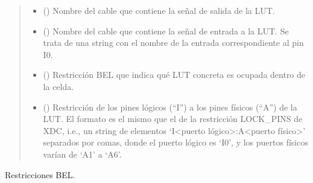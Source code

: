\documentclass[letterpaper,10pt,english]{sphinxmanual}
\begin{document}
\begin{fulllineitems}
\begin{quote}
\begin{description}
\begin{itemize}
\item {} 
\sphinxAtStartPar
{} () \textendash{} Nombre del cable que contiene la señal de salida de la LUT.

\item {} 
\sphinxAtStartPar
{} () \textendash{} Nombre del cable que contiene la señal de entrada a la LUT. Se trata de una string con el nombre de la entrada correspondiente al pin I0.

\item {} 
\sphinxAtStartPar
{} (\sphinxstyleliteralemphasis{\sphinxupquote{, }}\sphinxstyleliteralemphasis{\sphinxupquote{, }}\sphinxstyleliteralemphasis{\sphinxupquote{, }}) \textendash{} Restricción BEL que indica qué LUT concreta es ocupada dentro de la celda.

\item {} 
\sphinxAtStartPar
{} () \textendash{} Restricción de los pines lógicos (“I”) a los pines físicos (“A”) de la LUT. El formato es el mismo que el de la restricción LOCK\_PINS de XDC, i.e., un string de elementos ‘I\textless{}puerto lógico\textgreater{}:A\textless{}puerto físico\textgreater{}’ separados por comas, donde el puerto lógico es ‘I0’, y los puertos físicos varían de ‘A1’ a ‘A6’.

\end{itemize}

\end{description}\end{quote}

\begin{fulllineitems}
\label{\detokenize{fpga:fpga.Lut6.bel}}
\pysigstartsignatures
{}
\pysigstopsignatures
\sphinxAtStartPar
Restricciones BEL.

\end{fulllineitems}


\end{fulllineitems}
\end{document}
